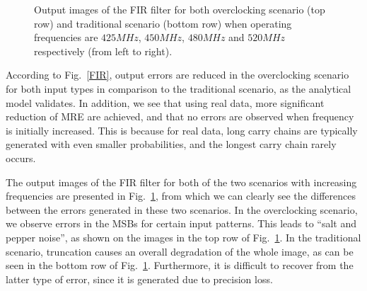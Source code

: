\documentclass[prodmode,acmtrets]{acmsmall} %
\begin{document}
\begin{figure}[ht]
{  }%
\caption{Output images of the FIR filter for both overclocking scenario (top row) and traditional scenario (bottom row) when operating frequencies are $425MHz$, $450MHz$, $480MHz$ and $520MHz$ respectively (from left to right).}
\label{FIR_Lena}
\end{figure}

According to Fig.~\ref{FIR}, output errors are reduced in the overclocking scenario for both input types in comparison to the traditional scenario, as the analytical model validates. In addition, we see that using real data, more significant reduction of MRE are achieved, and that no errors are observed when frequency is initially increased. This is because for real data, long carry chains are typically generated with even smaller probabilities, and the longest carry chain rarely occurs.

The output images of the FIR filter for both of the two scenarios with increasing frequencies are presented in Fig.~\ref{FIR_Lena}, from which we can clearly see the differences between the errors generated in these two scenarios. In the overclocking scenario, we observe errors in the MSBs for certain input patterns. This leads to ``salt and pepper noise'', as shown on the images in the top row of Fig.~\ref{FIR_Lena}. In the traditional scenario, truncation causes an overall degradation of the whole image, as can be seen in the bottom row of Fig.~\ref{FIR_Lena}. Furthermore, it is difficult to recover from the latter type of error, since it is generated due to precision loss.
\end{document}
